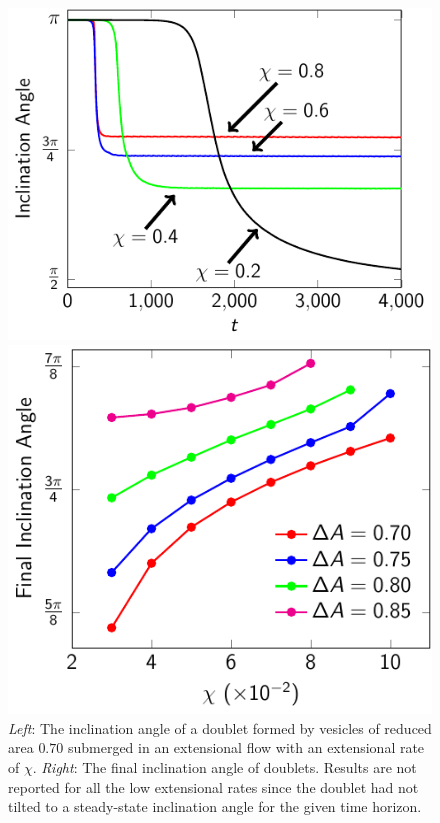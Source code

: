 \documentclass[prf,superscriptaddress,showpacs]{revtex4-1}
\begin{document}
\begin{figure}[htp]
  \begin{minipage}{0.45\textwidth}
  \centering
  \includegraphics[height=0.8\textwidth]{figs/adR4em1adS7em1_ra070_inclinationAngle.pdf}
  \end{minipage}
  \hfill
  \begin{minipage}{0.45\textwidth}
    \includegraphics[height=0.8\textwidth]{figs/adR4em1adS7em1_finalInclinationAngle.pdf}
  \end{minipage}
  \caption{\label{fig:extensionalInclinationAngle} {\em Left}: The
  inclination angle of a doublet formed by vesicles of reduced area
  $0.70$ submerged in an extensional flow with an extensional rate of
  $\chi$.  {\em Right}: The final inclination angle of doublets.
  Results are not reported for all the low extensional rates since the
  doublet had not tilted to a steady-state inclination angle for the
  given time horizon.}
\end{figure}
\end{document}

